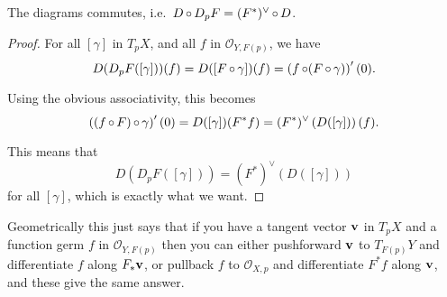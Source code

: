 \documentclass[a4paper,11pt]{article}
\begin{document}
	\begin{lem}
		The diagrams commutes, i.e.\ $D \operatorname{\circ} D_p F = (F^*)^{\vee} \operatorname{\circ} D$.
	\end{lem}
	\begin{proof}
		For all $[\gamma]$ in $T_p X$, and all $f$ in $\mathcal{O}_{Y,F(p)}$, we have
		\[
			D(D_p F([\gamma])) (f) = D([F \operatorname{\circ} \gamma]) (f) = \left( f \operatorname{\circ} (F \operatorname{\circ} \gamma) \right)' (0).
		\]
		
		Using the obvious associativity, this becomes
		\[
			\left( (f \operatorname{\circ} F) \operatorname{\circ} \gamma \right)' (0) = D([\gamma]) (F^* f) = (F^*)^{\vee} \left( D([\gamma]) \right) (f).
		\]
		
		This means that
		\[
			D(D_p F([\gamma])) = (F^*)^{\vee} (D([\gamma]))
		\]
		for all $[\gamma]$, which is exactly what we want.
	\end{proof}

	Geometrically this just says that if you have a tangent vector $\vb v$ in $T_p X$ and a function germ $f$ in $\mathcal{O}_{Y,F(p)}$ then you can either pushforward $\vb v$ to $T_{F(p)}Y$ and differentiate $f$ along $F_* \vb v$, or pullback $f$ to $\mathcal{O}_{X,p}$ and differentiate $F^* f$ along $\vb v$, and these give the same answer. 
\end{document}
